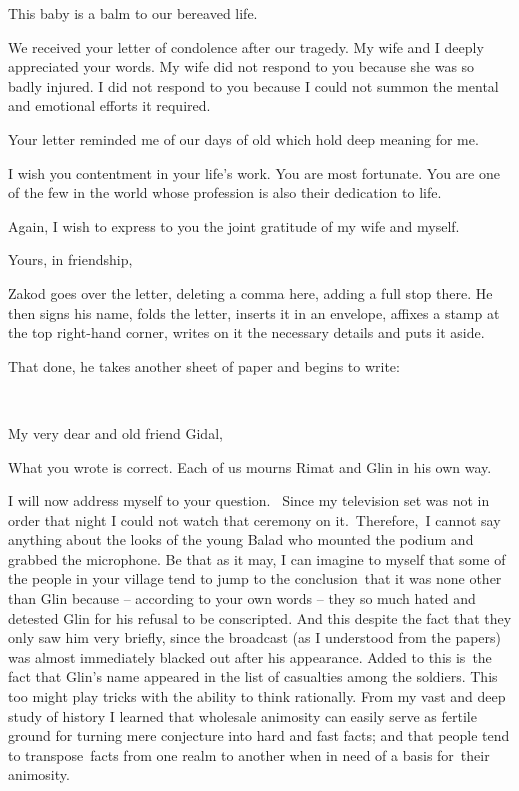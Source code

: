 \documentclass[twoside,11pt]{book}
\begin{document}
This baby is a balm to our bereaved life.

We received your letter of condolence after our tragedy. My wife and I deeply appreciated your words. My wife did not
respond to you because she was so badly injured. I did not respond to you because I could not summon the mental and
emotional efforts it required.

Your letter reminded me of our days of old which hold deep meaning for me.\ 

I wish you contentment in your life's work. You are most fortunate. You are one of the few in the world whose profession
is also their dedication to life.

Again, I wish to express to you the joint gratitude of my wife and myself.

Yours, in friendship,

Zakod goes over the letter, deleting a comma here, adding a full stop there. He then signs his name, folds the letter,
inserts it in an envelope, affixes a stamp at the top right-hand corner, writes on it the necessary details and puts it
aside.

That done, he takes another sheet of paper and begins to write:

~

My very dear and old friend Gidal,\ 

What you wrote is correct. Each of us mourns Rimat and Glin in his own way.

I will now address myself to your question. ~Since my television set was not in order that night I could not watch that
ceremony on it.\ Therefore,\ I cannot say anything about the looks of the young Balad who mounted the podium and
grabbed the microphone. Be that as it may, I can imagine to myself that some of the people in your village tend to jump
to the conclusion~that it was none other than Glin because -- according to your own words -- they {\textquotedbl}so
much hated and detested Glin for his refusal to be conscripted.{\textquotedbl} And this despite the fact that they only
saw him very briefly, since the broadcast (as I understood from the papers) was almost immediately blacked out after
his appearance. Added to this is~the fact that Glin's name appeared in the list of casualties among the soldiers. This
too might play tricks with the ability to think rationally. From my vast and deep study of history I learned that
wholesale animosity can easily serve as fertile ground for turning mere conjecture into hard and fast facts; and that
people tend to transpose~facts from one realm to another when in need of a basis for~their animosity.
\end{document}
